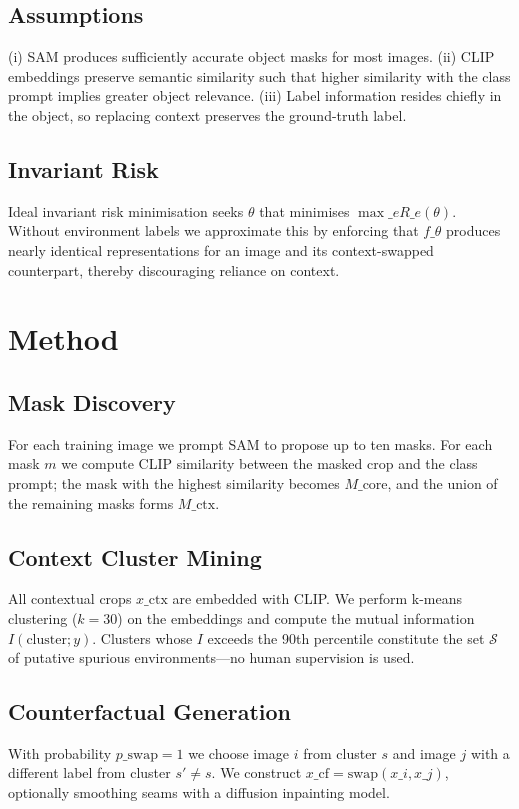 \documentclass{article}
\begin{document}
\subsection{Assumptions}
(i) SAM produces sufficiently accurate object masks for most images. (ii) CLIP embeddings preserve semantic similarity such that higher similarity with the class prompt implies greater object relevance. (iii) Label information resides chiefly in the object, so replacing context preserves the ground-truth label.

\subsection{Invariant Risk}
Ideal invariant risk minimisation seeks \(\theta\) that minimises \(\max\limits\_{e} R\_{e}(\theta)\). Without environment labels we approximate this by enforcing that \(f\_{\theta}\) produces nearly identical representations for an image and its context-swapped counterpart, thereby discouraging reliance on context.

\section{Method}
\subsection{Mask Discovery}
For each training image we prompt SAM to propose up to ten masks. For each mask \(m\) we compute CLIP similarity between the masked crop and the class prompt; the mask with the highest similarity becomes \(M\_{\text{core}}\), and the union of the remaining masks forms \(M\_{\text{ctx}}\).

\subsection{Context Cluster Mining}
All contextual crops \(x\_{\text{ctx}}\) are embedded with CLIP. We perform k-means clustering (\(k = 30\)) on the embeddings and compute the mutual information \(I(\text{cluster}; y)\). Clusters whose \(I\) exceeds the 90th percentile constitute the set \(\mathcal{S}\) of putative spurious environments—no human supervision is used.

\subsection{Counterfactual Generation}
With probability \(p\_{\text{swap}} = 1\) we choose image \(i\) from cluster \(s\) and image \(j\) with a different label from cluster \(s'\neq s\). We construct \(x\_{\text{cf}} = \mathrm{swap}(x\_i,x\_j)\), optionally smoothing seams with a diffusion inpainting model.
\end{document}
